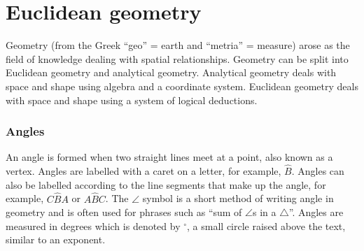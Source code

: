 \chapter{Euclidean geometry}
\setcounter{figure}{1}
\setcounter{subfigure}{1}
\setcounter{figure}{1}
\setcounter{subfigure}{1}

Geometry (from the Greek ``geo'' = earth and ``metria'' = measure) arose as the field of knowledge
dealing with spatial relationships. Geometry can be split into Euclidean geometry and analytical geometry. 
Analytical geometry deals with space and shape using algebra and a coordinate system. 
Euclidean geometry deals with space and shape using a system of logical deductions.\par 


\subsection*{Angles}
An angle is formed when two straight lines meet at a point, also known as a vertex. 
Angles are labelled with a caret on a letter, for example, $\hat{B}$.
Angles can also be labelled according to the line segments that make up the
angle, for example, $C\hat{B}A$ or $A\hat{B}C$. 
The $\angle $ symbol is a short method of writing angle in
geometry and is often used for phrases such as ``sum of $\angle$s in a $\triangle$''.
Angles are measured in degrees which is denoted by $^{\circ }$, a small circle
raised above the text, similar to an exponent.\par 


